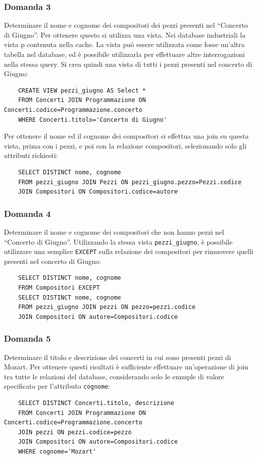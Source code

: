 \documentclass{article}
\begin{document}
\subsubsection*{Domanda 3}
Determinare il nome e cognome dei compositori dei pezzi presenti nel ``Concerto di Giugno''. Per ottenere questo si utilizza una vista. Nei database industriali 
la vista p contenuta nella cache. La vista può essere utilizzata come fosse un'altra tabella nel database, ed è possibile utilizzarla per effettuare altre 
interrogazioni nella stessa query. Si crea quindi una vista di tutti i pezzi presenti nel concerto di Giugno:
\begin{verbatim}
    CREATE VIEW pezzi_giugno AS Select *
    FROM Concerti JOIN Programmazione ON Concerti.codice=Programmazione.concerto
    WHERE Concerti.titolo='Concerto di Giugno'
\end{verbatim}
Per ottenere il nome ed il cognome dei compositori si effettua una join su questa vista, prima con i pezzi, e poi con la relazione compositori, selezionando solo gli 
attributi richiesti:
\begin{verbatim}
    SELECT DISTINCT nome, cognome
    FROM pezzi_giugno JOIN Pezzi ON pezzi_giugno.pezzo=Pezzi.codice
    JOIN Compositori ON Compositori.codice=autore
\end{verbatim}

\subsubsection*{Domanda 4}
Determinare il nome e cognome dei compositori che non hanno pezzi nel ``Concerto di Giugno''. Utilizzando la stessa vista \verb|pezzi_giugno|, è possibile utilizzare una semplice \verb|EXCEPT| sulla 
relazione dei compositori per rimuovere quelli presenti nel concerto di Giugno:
\begin{verbatim}
    SELECT DISTINCT nome, cognome
    FROM Compositori EXCEPT
    SELECT DISTINCT nome, cognome
    FROM pezzi_giugno JOIN pezzi ON pezzo=pezzi.codice 
    JOIN Compositori ON autore=Compositori.codice
\end{verbatim}

\subsubsection*{Domanda 5}
Determinare il titolo e descrizione dei concerti in cui sono presenti pezzi di Mozart. Per ottenere questi risultati è sufficiente effettuare un'operazione di join tra tutte le relazioni del database, 
considerando solo le ennuple di valore specificato per l'attributo \verb|cognome|:
\begin{verbatim}
    SELECT DISTINCT Concerti.titolo, descrizione 
    FROM Concerti JOIN Programmazione ON Concerti.codice=Programmazione.concerto
    JOIN pezzi ON pezzi.codice=pezzo
    JOIN Compositori ON autore=Compositori.codice
    WHERE cognome='Mozart'
\end{verbatim}
\end{document}
